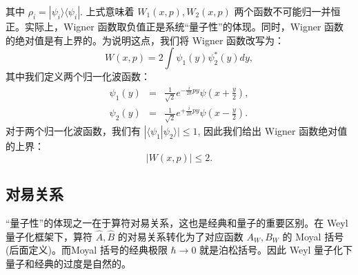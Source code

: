 \documentclass[10pt,UTF8]{ctexart}
\begin{document}
其中 $\rho_i = |\psi_i\rangle\langle \psi_i|$. 上式意味着 $W_1(x,p),W_2(x,p)$ 两个函数不可能归一并恒正。实际上，Wigner 函数取负值正是系统“量子性”的体现。同时，Wigner 函数的绝对值是有上界的。为说明这点，我们将 Wigner 函数改写为：
\begin{equation}
	W(x,p) = 2 \int \psi_1(y)\psi_2^{*}(y) dy,
\end{equation}
其中我们定义两个归一化波函数：
\begin{eqnarray}
	\psi_1(y) &=& \frac{1}{\sqrt{2}}e^{-\frac{i}{2\hbar}py} \psi\left(x+\frac{y}{2}\right), \\
	\psi_2(y) &=& \frac{1}{\sqrt{2}}e^{+\frac{i}{2\hbar}py} \psi\left(x-\frac{y}{2}\right).
\end{eqnarray}
对于两个归一化波函数，我们有 $|\langle\psi_1|\psi_2\rangle| \le 1$, 因此我们给出 Wigner 函数绝对值的上界：
\begin{equation}
	|W(x,p)| \le 2.
\end{equation}



\subsection*{对易关系}
\noindent
“量子性”的体现之一在于算符对易关系，这也是经典和量子的重要区别。在 Weyl 量子化框架下，算符 $\hat A,\hat B$ 的对易关系转化为了对应函数 $A_W,B_W$ 的 Moyal 括号(后面定义)。而Moyal 括号的经典极限 $\hbar \rightarrow 0$ 就是泊松括号。因此 Weyl 量子化下量子和经典的过度是自然的。
\end{document}
